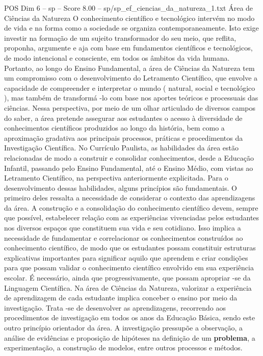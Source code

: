 \begin{textsample}{POS Dim 6 – sp – Score 8.00 – sp/sp\_ef\_ciencias\_da\_natureza\_1.txt}  \label{ex:f6_pos_085}
Área de Ciências da Natureza O conhecimento científico e tecnológico intervém no modo de vida e na forma como a sociedade se organiza contemporaneamente.
Isto exige investir na formação de um sujeito transformador do seu meio, que reflita, proponha, argumente e aja com base em fundamentos científicos e tecnológicos, de modo intencional e consciente, em todos os âmbitos da vida humana.
Portanto, ao longo do Ensino Fundamental, a área de Ciências da Natureza tem um compromisso com o desenvolvimento do Letramento Científico, que envolve a capacidade de compreender e interpretar o mundo ( natural, social e tecnológico ), mas também de transformá -lo com base nos aportes teóricos e processuais das ciências.
Nessa perspectiva, por meio de um olhar articulado de diversos campos do saber, a área pretende assegurar aos estudantes o acesso à diversidade de conhecimentos científicos produzidos ao longo da história, bem como a aproximação gradativa aos principais processos, práticas e procedimentos da Investigação Científica.
No Currículo Paulista, as habilidades da área estão relacionadas de modo a construir e consolidar conhecimentos, desde a Educação Infantil, passando pelo Ensino Fundamental, até o Ensino Médio, com vistas ao Letramento Científico, na perspectiva anteriormente explicitada.
Para o desenvolvimento dessas habilidades, alguns princípios são fundamentais.
O primeiro deles ressalta a necessidade de considerar o contexto das aprendizagens da área.
A construção e a consolidação do conhecimento científico devem, sempre que possível, estabelecer relação com as experiências vivenciadas pelos estudantes nos diversos espaços que constituem sua vida e seu cotidiano.
Isso implica a necessidade de fundamentar e correlacionar os conhecimentos construídos ao conhecimento científico, de modo que os estudantes possam constituir estruturas explicativas importantes para significar aquilo que aprendem e criar condições para que possam validar o conhecimento científico envolvido em sua experiência escolar.
É necessário, ainda que progressivamente, que possam apropriar -se da Linguagem Científica.
Na área de Ciências da Natureza, valorizar a experiência de aprendizagem de cada estudante implica conceber o ensino por meio da investigação.
Trata -se de desenvolver as aprendizagens, recorrendo aos procedimentos de investigação em todos os anos da Educação Básica, sendo este outro princípio orientador da área.
A investigação pressupõe a observação, a análise de evidências e proposição de hipóteses na definição de um \textbf{problema}, a experimentação, a construção de modelos, entre outros processos e métodos.

\end{textsample}
